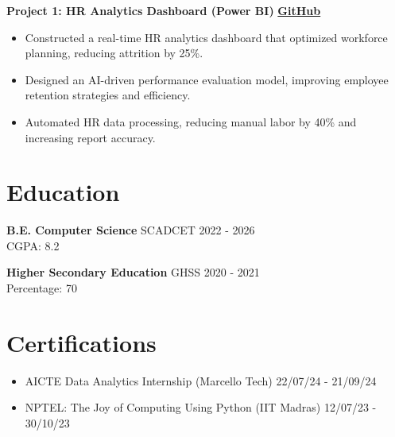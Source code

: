 \documentclass[a4paper,10pt]{article}
\begin{document}
\textbf{Project 1: HR Analytics Dashboard (Power BI)} \hfill \textbf{\textcolor{graycolor}{\href{https://github.com/Mubarak-04/HR-Analysis-Dashboard}{GitHub}}}
\begin{itemize}
    \item Constructed a real-time HR analytics dashboard that optimized workforce planning, reducing attrition by 25\%.
    \item Designed an AI-driven performance evaluation model, improving employee retention strategies and efficiency.
    \item Automated HR data processing, reducing manual labor by 40\% and increasing report accuracy.
\end{itemize}

\section*{Education}
\textbf{B.E. Computer Science}  
\hfill SCADCET \hfill 2022 - 2026\\
CGPA: 8.2

\textbf{Higher Secondary Education}  
\hfill GHSS \hfill 2020 - 2021\\
Percentage: 70

\section*{Certifications}
\begin{itemize}
    \item AICTE Data Analytics Internship (Marcello Tech) \hfill 22/07/24 - 21/09/24
    \item NPTEL: The Joy of Computing Using Python (IIT Madras) \hfill 12/07/23 - 30/10/23
\end{itemize}
\end{document}
